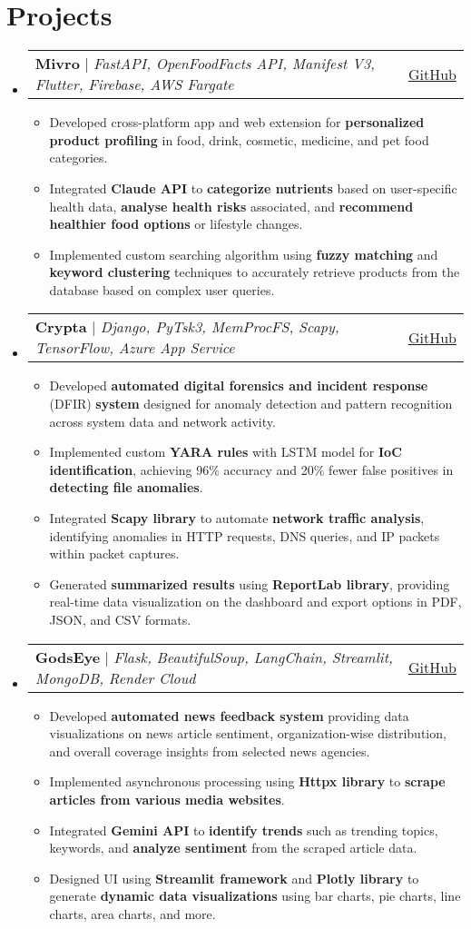 \documentclass[a4paper,11pt]{article}
\makeatletter
\newcommand{\resumeItem}[1]{\item\small{#1 \vspace{-2pt}}}
\newcommand{\resumeProject}[3]{
    \item
    \begin{tabular*}{0.97\textwidth}{l@{\extracolsep{\fill}}r}
        \small#2 & \small\href{#1}{\underline{#3}} \\
    \end{tabular*}\vspace{-7pt}
}
\newcommand{\resumeSubHeadingListStart}{\begin{itemize}[leftmargin=0.15in, label={}]}
\newcommand{\resumeSubHeadingListEnd}{\end{itemize}}
\newcommand{\resumeItemListStart}{\begin{itemize}}
\newcommand{\resumeItemListEnd}{\end{itemize}\vspace{-5pt}}
\makeatother
\begin{document}
\section{Projects}
\resumeSubHeadingListStart
    \resumeProject
        {https://github.com/SpaceTesla/Mivro}{\textbf{Mivro} $|$ \emph{FastAPI, OpenFoodFacts API, Manifest V3, Flutter, Firebase, AWS Fargate}}{GitHub}
        \resumeItemListStart
            \resumeItem{Developed cross-platform app and web extension for \textbf{personalized product profiling} in food, drink, cosmetic, medicine, and pet food categories.}
            \resumeItem{Integrated \textbf{Claude API} to \textbf{categorize nutrients} based on user-specific health data, \textbf{analyse health risks} associated, and \textbf{recommend healthier food options} or lifestyle changes.}
            \resumeItem{Implemented custom searching algorithm using \textbf{fuzzy matching} and \textbf{keyword clustering} techniques to accurately retrieve products from the database based on complex user queries.}
        \resumeItemListEnd
    \resumeProject
        {https://github.com/1MindLabs/crypta-backend}{\textbf{Crypta} $|$ \emph{Django, PyTsk3, MemProcFS, Scapy, TensorFlow, Azure App Service}}{GitHub}
        \resumeItemListStart
            \resumeItem{Developed \textbf{automated digital forensics and incident response} (DFIR) \textbf{system} designed for anomaly detection and pattern recognition across system data and network activity.}
            \resumeItem{Implemented custom \textbf{YARA rules} with LSTM model for \textbf{IoC identification}, achieving 96\% accuracy and 20\% fewer false positives in \textbf{detecting file anomalies}.}
            \resumeItem{Integrated \textbf{Scapy library} to automate \textbf{network traffic analysis}, identifying anomalies in HTTP requests, DNS queries, and IP packets within packet captures.}
            \resumeItem{Generated \textbf{summarized results} using \textbf{ReportLab library}, providing real-time data visualization on the dashboard and export options in PDF, JSON, and CSV formats.}
        \resumeItemListEnd
    \resumeProject
        {https://github.com/areebahmeddd/GodsEye}{\textbf{GodsEye} $|$ \emph{Flask, BeautifulSoup, LangChain, Streamlit, MongoDB, Render Cloud}}{GitHub}
        \resumeItemListStart
            \resumeItem{Developed \textbf{automated news feedback system} providing data visualizations on news article sentiment, organization-wise distribution, and overall coverage insights from selected news agencies.}
            \resumeItem{Implemented asynchronous processing using \textbf{Httpx library} to \textbf{scrape articles from various media websites}.}
            \resumeItem{Integrated \textbf{Gemini API} to \textbf{identify trends} such as trending topics, keywords, and \textbf{analyze sentiment} from the scraped article data.}
            \resumeItem{Designed UI using \textbf{Streamlit framework} and \textbf{Plotly library} to generate \textbf{dynamic data visualizations} using bar charts, pie charts, line charts, area charts, and more.}
        \resumeItemListEnd
\resumeSubHeadingListEnd
\end{document}
